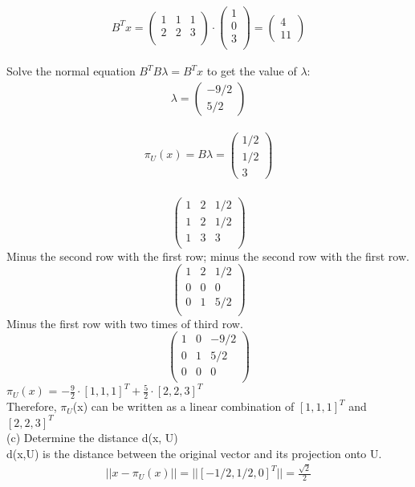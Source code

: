 \documentclass{article}
\begin{document}
\begin{gather}
B^Tx = \begin{pmatrix}
1 & 1 & 1\\
2 & 2 & 3\\
\end{pmatrix} \cdot \begin{pmatrix}
1\\
0\\
3\\
\end{pmatrix} = \begin{pmatrix}
4\\ 11
\end{pmatrix}
\end{gather}

Solve the normal equation $B^TB\lambda = B^Tx$ to get the value of $\lambda$:\\
\begin{gather}
\lambda = \begin{pmatrix}
-9/2 \\ 5/2
\end{pmatrix}
\end{gather}

\begin{gather}
\pi_U(x) = B \lambda =  \begin{pmatrix}
1/2\\1/2\\3
\end{pmatrix}
\end{gather}\\

\begin{equation}
\begin{pmatrix}
1 & 2 & 1/2 \\
1 & 2 & 1/2 \\
1 & 3 & 3 \\
\end{pmatrix}
\end{equation}
Minus the second row with the first row; minus the second row with the first row.
\begin{equation}
\begin{pmatrix}
1 & 2 & 1/2 \\
0 & 0 & 0 \\
0 & 1 & 5/2 \\
\end{pmatrix}
\end{equation}
Minus the first row with two times of third row.
\begin{equation}
\begin{pmatrix}
1 & 0 & -9/2\\
0 & 1 & 5/2\\
0 & 0 & 0\\
\end{pmatrix}
\end{equation}
$\pi_U(x)$ = $-\frac{9}{2} \cdot [1, 1, 1]^T + \frac{5}{2} \cdot [2,2,3]^T$\\
Therefore, $\pi_U$(x) can be written as a linear combination of $[1, 1, 1]^T$ and $[2, 2, 3]^T$\\

(c) Determine the distance d(x, U)\\
d(x,U) is the distance between the original vector and its projection onto U.
\begin{gather}
||x - \pi_U(x)|| = ||[-1/2,1/2,0]^T|| = \frac{\sqrt{2}}{2}
\end{gather}
\end{document}
